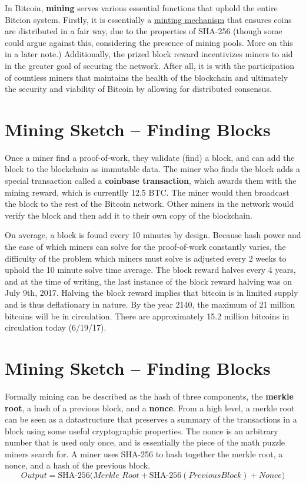\documentclass[11pt]{article}
\begin{document}
    In Bitcoin, \textbf{mining} serves various essential functions that uphold the entire Bitcion system. Firstly, it is essentially a \underline{minting mechanism} that ensures coins are distributed in a fair way, due to the properties of SHA-256 (though some could argue against this, considering the presence of mining pools. More on this in a later note.) Additionally, the prized block reward incentivizes miners to aid in the greater goal of securing the network. After all, it is with the participation of countless miners that maintains the health of the blockchain and ultimately the security and viability of Bitcoin by allowing for distributed consensus.
    
    \section*{Mining Sketch -- Finding Blocks}
    
    Once a miner find a proof-of-work, they validate (find) a block, and can add the block to the blockchain as immutable data. The miner who finds the block adds a special transaction called a \textbf{coinbase transaction}, which awards them with the mining reward, which is currentlly 12.5 BTC. The miner would then broadcast the block to the rest of the Bitcoin network. Other miners in the network would verify the block and then add it to their own copy of the blockchain. 
    
    On average, a block is found every 10 minutes by design. Because hash power and the ease of which miners can solve for the proof-of-work constantly varies, the difficulty of the problem which miners must solve is adjusted every 2 weeks to uphold the 10 minute solve time average. The block reward halves every 4 years, and at the time of writing, the last instance of the block reward halving was on July 9th, 2017. Halving the block reward implies that bitcoin is in limited supply and is thus deflationary in nature. By the year 2140, the maximum of 21 million bitcoins will be in circulation. There are approximately 15.2 million bitcoins in circulation today (6/19/17). 
    
    \section*{Mining Sketch -- Finding Blocks}
    
    Formally mining can be described as the hash of three components, the \textbf{merkle root}, a hash of a previous block, and a \textbf{nonce}. From a high level, a merkle root can be seen as a datastructure that preserves a summary of the transactions in a block using some useful cryptographic properties. The nonce is an arbitrary number that is used only once, and is essentially the piece of the math puzzle miners search for. A miner uses SHA-256 to hash together the merkle root, a nonce, and a hash of the previous block. 
    $$Output = \text{SHA-256}\big(\textit{Merkle Root} + \text{SHA-256}(Previous Block) + Nonce\big)$$
    
\end{document}
